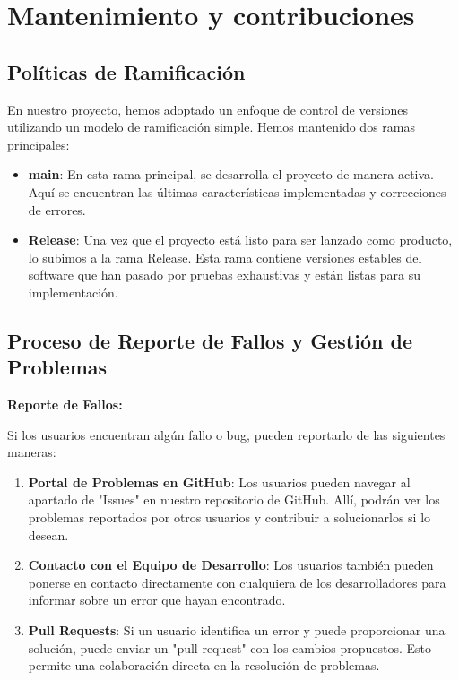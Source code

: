 \documentclass{article}
\begin{document}
\section{Mantenimiento y contribuciones}

    \subsection{Políticas de Ramificación}
    
    En nuestro proyecto, hemos adoptado un enfoque de control de versiones utilizando un modelo de ramificación simple. Hemos mantenido dos ramas principales:
    
    \begin{itemize}
        \item \textbf{main}: En esta rama principal, se desarrolla el proyecto de manera activa. Aquí se encuentran las últimas características implementadas y correcciones de errores.
        
        \item \textbf{Release}: Una vez que el proyecto está listo para ser lanzado como producto, lo subimos a la rama Release. Esta rama contiene versiones estables del software que han pasado por pruebas exhaustivas y están listas para su implementación.
    \end{itemize}
    
    \subsection{Proceso de Reporte de Fallos y Gestión de Problemas}
    
    \textbf{Reporte de Fallos:}
    
    Si los usuarios encuentran algún fallo o bug, pueden reportarlo de las siguientes maneras:
    
    \begin{enumerate}
        \item \textbf{Portal de Problemas en GitHub}: Los usuarios pueden navegar al apartado de "Issues" en nuestro repositorio de GitHub. Allí, podrán ver los problemas reportados por otros usuarios y contribuir a solucionarlos si lo desean.
        
        \item \textbf{Contacto con el Equipo de Desarrollo}: Los usuarios también pueden ponerse en contacto directamente con cualquiera de los desarrolladores para informar sobre un error que hayan encontrado.
        
        \item \textbf{Pull Requests}: Si un usuario identifica un error y puede proporcionar una solución, puede enviar un "pull request" con los cambios propuestos. Esto permite una colaboración directa en la resolución de problemas.
    \end{enumerate}
    
\end{document}
